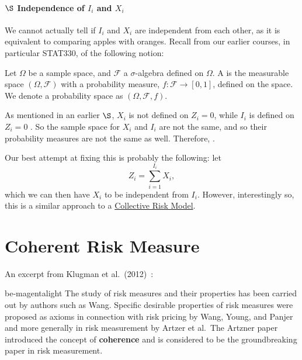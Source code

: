 \documentclass[notoc,notitlepage]{tufte-book}
\begin{document}
\paragraph{$\S$ Independence of $I_i$ and $X_i$} We cannot actually tell if $I_i$ and $X_i$ are independent from each other, as it is equivalent to comparing apples with oranges. Recall from our earlier courses, in particular STAT330, of the following notion:

\begin{defnnonum}\label{defn:probability_space}
  Let $\Omega$ be a sample space, and $\mathcal{F}$ a $\sigma$-algebra defined on $\Omega$. A  is the measurable space $(\Omega, \mathcal{F})$ with a \textcolor{be-blue}{probability measure}, $f: \mathcal{F} \to [0, 1]$, defined on the space. We denote a probability space as $(\Omega, \mathcal{F}, f)$.
\end{defnnonum}

As mentioned in an earlier $\S$, $X_i$ is not defined on $Z_i = 0$, while $I_i$ is defined on $Z_i = 0$ . So the sample space for $X_i$ and $I_i$ are not the same, and so their probability measures are not the same as well. Therefore, .

Our best attempt at fixing this is probably the following: let
\begin{equation*}
  Z_i = \sum_{i=1}^{I_i} X_i,
\end{equation*}
which we can then have $X_i$ to be independent from $I_i$. However, interestingly so, this is a similar approach to a \hyperref[defn:collective_risk_model]{Collective Risk Model}.


\section{Coherent Risk Measure}%
\label{sec:coherent_risk_measure}

An excerpt from Klugman et al.\ (2012)~\cite{KlugmanPanjerWillmot2012}:

\begin{quotebox}{be-magenta}{light}
  The study of risk measures and their properties has been carried out by authors such as Wang. Specific desirable properties of risk measures were proposed as axioms in connection with risk pricing by Wang, Young, and Panjer and more generally in risk measurement by Artzer et al.\ The Artzner paper introduced the concept of \textbf{coherence} and is considered to be the groundbreaking paper in risk measurement.
\end{quotebox}
\end{document}
